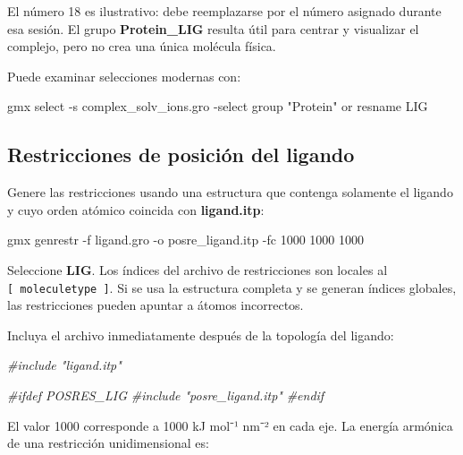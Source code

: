 \documentclass[
  spanish,
  11pt,
  a4paper]{article}
\newenvironment{Shaded}{\begin{snugshade}}{\end{snugshade}}
\newcommand{\AttributeTok}[1]{\textcolor[rgb]{0.13,0.29,0.53}{#1}}
\newcommand{\CommentTok}[1]{\textcolor[rgb]{0.56,0.35,0.01}{\textit{#1}}}
\newcommand{\ExtensionTok}[1]{#1}
\newcommand{\NormalTok}[1]{#1}
\newcommand{\StringTok}[1]{\textcolor[rgb]{0.31,0.60,0.02}{#1}}
\begin{document}
El número 18 es ilustrativo: debe reemplazarse por el número asignado
durante esa sesión. El grupo \textbf{Protein\_LIG} resulta útil para
centrar y visualizar el complejo, pero no crea una única molécula
física.

Puede examinar selecciones modernas con:

\begin{Shaded}
\begin{Highlighting}[]
\ExtensionTok{gmx}\NormalTok{ select     }\AttributeTok{{-}s}\NormalTok{ complex\_solv\_ions.gro     }\AttributeTok{{-}select} \StringTok{\textquotesingle{}group "Protein" or resname LIG\textquotesingle{}}
\end{Highlighting}
\end{Shaded}

\subsection{Restricciones de posición del
ligando}\label{restricciones-de-posiciuxf3n-del-ligando}

Genere las restricciones usando una estructura que contenga solamente el
ligando y cuyo orden atómico coincida con \textbf{ligand.itp}:

\begin{Shaded}
\begin{Highlighting}[]
\ExtensionTok{gmx}\NormalTok{ genrestr     }\AttributeTok{{-}f}\NormalTok{ ligand.gro     }\AttributeTok{{-}o}\NormalTok{ posre\_ligand.itp     }\AttributeTok{{-}fc}\NormalTok{ 1000 1000 1000}
\end{Highlighting}
\end{Shaded}

Seleccione \textbf{LIG}. Los índices del archivo de restricciones son
locales al \texttt{{[}\ moleculetype\ {]}}. Si se usa la estructura
completa y se generan índices globales, las restricciones pueden apuntar
a átomos incorrectos.

Incluya el archivo inmediatamente después de la topología del ligando:

\begin{Shaded}
\begin{Highlighting}[]
\CommentTok{\#include "ligand.itp"}

\CommentTok{\#ifdef POSRES\_LIG}
\CommentTok{\#include "posre\_ligand.itp"}
\CommentTok{\#endif}
\end{Highlighting}
\end{Shaded}

El valor 1000 corresponde a 1000 kJ mol⁻¹ nm⁻² en cada eje. La energía
armónica de una restricción unidimensional es:
\end{document}
